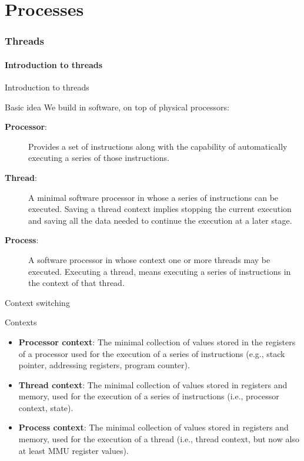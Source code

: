 \part{Processes}
\section{Threads}
\subsection{Introduction to threads}
\begin{slide}{Introduction to threads}
  \begin{block}{Basic idea} 
    We build  in software, on top of physical processors:
    \begin{description}
    \item[\textbf{Processor}:] Provides a set of instructions along with the capability of automatically
      executing a series of those instructions.
    \item[\textbf{Thread}:] A minimal software processor in whose  a series of instructions can be
      executed. Saving a thread context implies stopping the current execution and saving all the data needed
      to continue the execution at a later stage.
    \item[\textbf{Process}:] A software processor in whose context one or more threads may be executed. Executing
      a thread, means executing a series of instructions in the context of that thread.
    \end{description}
  \end{block}
\end{slide}
\begin{slide}{Context switching}
  \begin{block}{Contexts}
    \begin{itemize}
    \item \textbf{Processor context}: The minimal collection of values stored in the registers of a processor
      used for the execution of a series of instructions (e.g., stack pointer, addressing registers, program
      counter).
    \item \textbf{Thread context}: The minimal collection of values stored in registers and memory, used for
      the execution of a series of instructions (i.e., processor context, state).
    \item \textbf{Process context}: The minimal collection of values stored in registers and memory, used for
      the execution of a thread (i.e., thread context, but now also at least MMU register values).
    \end{itemize}
  \end{block}
\end{slide}
